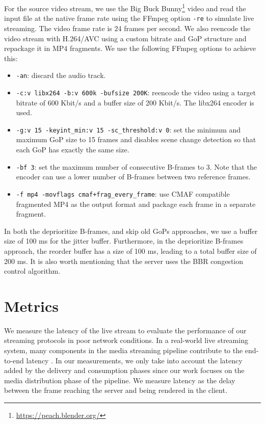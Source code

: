 For the source video stream, we use the Big Buck Bunny\footnote{\url{https://peach.blender.org/}} video and read the input file at the native frame rate using the FFmpeg option \lstinline{-re} to simulate live streaming. The video frame rate is 24 frames per second. We also reencode the video stream with H.264/AVC using a custom bitrate and GoP structure and repackage it in MP4 fragments. We use the following FFmpeg options to achieve this:
\begin{itemize}
    \item \lstinline{-an}: discard the audio track.
    \item \lstinline{-c:v libx264 -b:v 600k -bufsize 200K}: reencode the video using a target bitrate of 600 Kbit/s and a buffer size of 200 Kbit/s. The libx264 encoder is used.
    \item \lstinline{-g:v 15 -keyint_min:v 15 -sc_threshold:v 0}: set the minimum and maximum GoP size to 15 frames and disables scene change detection so that each GoP has exactly the same size. 
    \item \lstinline{-bf 3}: set the maximum number of consecutive B-frames to 3. Note that the encoder can use a lower number of B-frames between two reference frames.
    \item \lstinline{-f mp4 -movflags cmaf+frag_every_frame}: use \ac{CMAF} compatible fragmented MP4 as the output format and package each frame in a separate fragment.
\end{itemize}

In both the deprioritize B-frames, and skip old \acp{GoP} approaches, we use a buffer size of 100 ms for the jitter buffer. Furthermore, in the deprioritize B-frames approach, the reorder buffer has a size of 100 ms, leading to a total buffer size of 200 ms. It is also worth mentioning that the server uses the BBR congestion control algorithm.

\section{Metrics}
We measure the latency of the live stream to evaluate the performance of our streaming protocols in poor network conditions. In a real-world live streaming system, many components in the media streaming pipeline contribute to the end-to-end latency \parencite{bentalebOneSecondLatencyEvolution2023}. In our measurements, we only take into account the latency added by the delivery and consumption phases since our work focuses on the media distribution phase of the pipeline. We measure latency as the delay between the frame reaching the server and being rendered in the client.  

